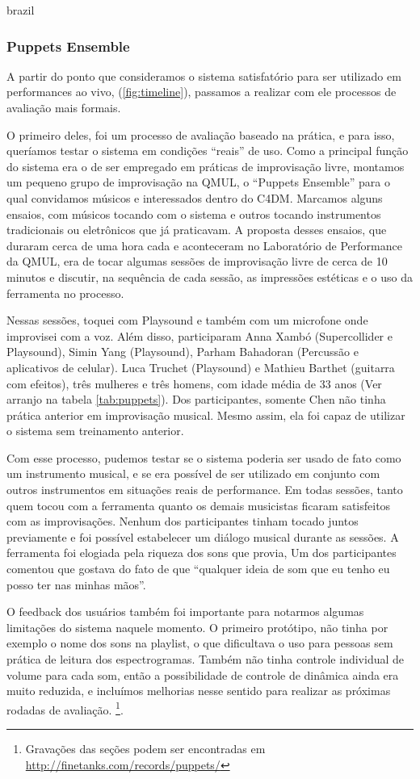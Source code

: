 \begin{otherlanguage*}{brazil}
\subsubsection{Puppets Ensemble}

A partir do ponto que consideramos o sistema satisfatório para ser utilizado em performances ao vivo, (\ref{fig:timeline}), passamos a realizar com ele processos de avaliação mais formais. 

O primeiro deles, foi um processo de avaliação baseado na prática, e para isso, queríamos testar o sistema em condições ``reais'' de uso. Como a principal função do sistema era o de ser empregado em práticas de improvisação livre, montamos um pequeno grupo de improvisação na QMUL, o ``Puppets Ensemble'' para o qual convidamos músicos e interessados dentro do C4DM. Marcamos alguns ensaios, com músicos tocando com o sistema e outros tocando instrumentos tradicionais ou eletrônicos que já praticavam. A proposta desses ensaios, que duraram cerca de uma hora cada e aconteceram no Laboratório de Performance da QMUL, era de tocar algumas sessões de improvisação livre de cerca de 10 minutos e discutir, na sequência de cada sessão, as impressões estéticas e o uso da ferramenta no processo.

Nessas sessões, toquei com Playsound e também com um microfone onde improvisei com a voz. Além disso, participaram Anna Xambó (Supercollider e Playsound), Simin Yang (Playsound), Parham Bahadoran (Percussão e aplicativos de celular). Luca Truchet (Playsound) e Mathieu Barthet (guitarra com efeitos), três mulheres e três homens, com idade média de 33 anos (Ver arranjo na tabela \ref{tab:puppets}). Dos participantes, somente Chen não tinha prática anterior em improvisação musical. Mesmo assim, ela foi capaz de utilizar o sistema sem treinamento anterior.

Com esse processo, pudemos testar se o sistema poderia ser usado de fato como um instrumento musical, e se era possível de ser utilizado em conjunto com outros instrumentos em situações reais de performance. Em todas sessões, tanto quem tocou com a ferramenta quanto os demais musicistas ficaram satisfeitos com as improvisações. Nenhum dos participantes tinham tocado juntos previamente e foi possível estabelecer um diálogo musical durante as sessões. A ferramenta foi elogiada pela riqueza dos sons que provia, Um dos participantes comentou que gostava do fato de que ``qualquer ideia de som que eu tenho eu posso ter nas minhas mãos''. 

O feedback dos usuários também foi importante para notarmos algumas limitações do sistema naquele momento. O primeiro protótipo, não tinha por exemplo o nome dos sons na playlist, o que dificultava o uso para pessoas sem prática de leitura dos espectrogramas. Também não tinha controle individual de volume para cada som, então a possibilidade de controle de dinâmica ainda era muito reduzida, e incluímos melhorias nesse sentido para realizar as próximas rodadas de avaliação.   \footnote{Gravações das seções podem ser encontradas em \url{http://finetanks.com/records/puppets/}}.


\end{otherlanguage*}

